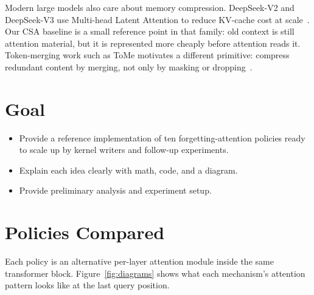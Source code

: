 \documentclass[10pt]{article}
\begin{document}
Modern large models also care about memory compression. DeepSeek-V2 and
DeepSeek-V3 use Multi-head Latent Attention to reduce KV-cache cost at
scale~\cite{deepseek_v2,deepseek_v3}. Our CSA baseline is a small
reference point in that family: old context is still attention material,
but it is represented more cheaply before attention reads it.
Token-merging work such as ToMe motivates a different primitive:
compress redundant content by merging, not only by masking or
dropping~\cite{tome}.

\section{Goal}

\begin{itemize}
\item Provide a reference implementation of ten forgetting-attention policies
ready to scale up by kernel writers and follow-up experiments.
\item Explain each idea clearly with math, code, and a diagram.
\item Provide preliminary analysis and experiment setup.
\end{itemize}

\section{Policies Compared}

Each policy is an alternative per-layer attention module inside the same
transformer block. Figure~\ref{fig:diagrams} shows what each mechanism's
attention pattern looks like at the last query position.
\end{document}
